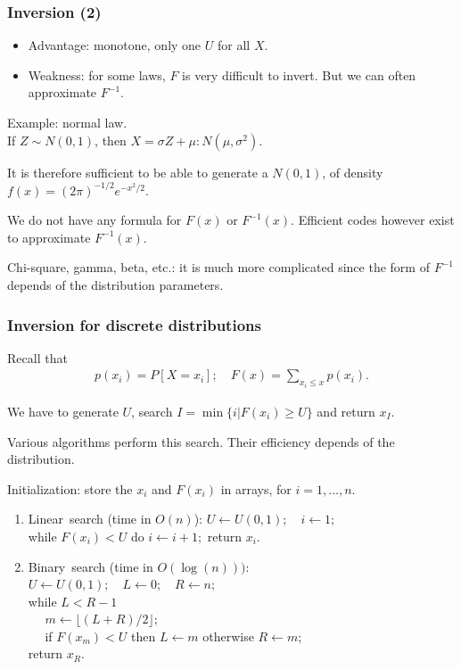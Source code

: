 \documentclass{beamer}
\begin{document}
	\begin{frame}
		\frametitle{Inversion (2)}
		
		\begin{itemize}
			\item
			{\red Advantage}: monotone, only one $U$ for all $X$.
			\item
			{\red Weakness}: for some laws, $F$ is very difficult to invert.
			But we can often approximate $F^{-1}$.
		\end{itemize}
		
		\mbox{}
		
		{\red Example}: normal law.\\
		If $Z \sim N (0, 1)$, then $X =  \sigma Z + \mu : N (\mu, \sigma^2)$.
		
		It is therefore sufficient to be able to generate a $N (0, 1)$, of
		density $f (x) = (2 \pi)^{-1/2} e^{-x^2 /2}$.
		
		We do not have any formula for $F (x)$ or $F^{-1}(x)$.
		Efficient codes however exist to approximate $F^{-1}(x)$.
		
		\mbox{}
		
		Chi-square, gamma, beta, etc.: it is much more complicated since the
		form of $F^{-1}$ depends of the distribution parameters.
		
	\end{frame}
	
	\begin{frame}
		\frametitle{Inversion for discrete distributions}
		
		Recall that
		\begin{align*}
			p(x_i) = P [X = x_i];\quad 
			F (x) = \sum_{x_i \leq x} p(x_i).
		\end{align*}
		
		We have to generate $U$, search $I = \min \lbrace i | F (x_i)  \geq U
		\rbrace$ and return $x_I$.
		
		Various algorithms perform this search. Their efficiency depends of
		the distribution.
		
		{\red Initialization}: store the $x_i$ and $F (x_i)$ in arrays, for $i
		= 1, \ldots, n$.
		\begin{enumerate}
			\item
			\mbox{\blue Linear search} (time in $O(n)$): $U \leftarrow U (0, 1);
			\quad i \leftarrow 1;$\\
			while $F (x_i) < U$ do $i \leftarrow i + 1;$ return $x_i$.
			\item
			\mbox{\blue Binary search} (time in $O(\log(n)))$:\\
			$U \leftarrow U (0, 1);\quad L \leftarrow 0;\quad R \leftarrow n;$\\
			while $L < R - 1$\\
			$\quad$ $m \leftarrow \lfloor (L + R)/2 \rfloor;$\\
			$\quad$ if $F (x_m) < U$ then $L \leftarrow m$ otherwise $R \leftarrow
			m$;\\
			return $x_R$.
		\end{enumerate}
		
	\end{frame}
	
\end{document}
